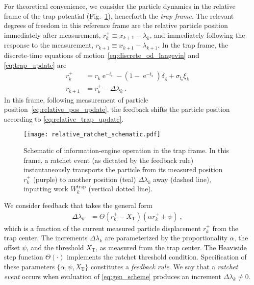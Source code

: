 \documentclass[%
reprint,
bibnotes, amsmath, amssymb, aps, pre,
 showkeys,
floatfix
]{revtex4-2}
\newcommand{\mrm}{\mathrm}
\newcommand{\pr}[1]{\left(#1\right)} %
\newcommand{\dg}{\delta_{\mrm{g}}}
\newcommand{\ts}{t_{\mrm{s}}}
\newcommand{\dlk}{\Delta\lambda_{k}}
\newcommand{\xkp}{x_{k+1}}
\newcommand{\lk}{\lambda_{k}}
\newcommand{\lkp}{\lambda_{k+1}}
\newcommand{\xkr}{r_{k}}
\newcommand{\xkrp}{r_{k+1}}
\newcommand{\xkpr}{r_{k}^{+}}
\newcommand{\wt}{W^{\mrm{trap}}}
\newcommand{\xT}{X_{\mrm{T}}}
\DeclareMathOperator{\e}{e}
\begin{document}
For theoretical convenience, we consider the particle dynamics in the relative frame of the trap potential (Fig.~\ref{fig:relative_ratchet_schematic}), henceforth the \emph{trap frame}.
The relevant degrees of freedom in this reference frame are the relative particle position immediately after measurement, $\xkpr \equiv \xkp-\lk$, and immediately following the response to the measurement, $\xkrp \equiv \xkp-\lkp$. 
In the trap frame, the discrete-time equations of motion~\eqref{eq:discrete_od_langevin} and \eqref{eq:trap_update} are 
\begin{subequations}\label{eq:relative_update}
    \begin{align}
        \xkpr &= \xkr\e^{-\ts} - \pr{1-\e^{-\ts}}\dg + \sigma_{\ts}\xi_{k}\label{eq:relative_pos_update}\\
        \xkrp &= \xkpr - \dlk \ . \label{eq:relative_trap_update}
    \end{align}
\end{subequations}
In this frame, following measurement of particle position~\eqref{eq:relative_pos_update}, the feedback shifts the particle position according to \eqref{eq:relative_trap_update}.

\begin{figure}[htbp]
    \centering
    \texttt{[image: relative\_ratchet\_schematic.pdf]}
    \caption{
        Schematic of information-engine operation in the trap frame.
        In this frame, a ratchet event (as dictated by the feedback rule) instantaneously transports the particle from its measured position $\xkpr$ (purple) to another position (teal) $\dlk$ away (dashed line), inputting work $\wt_{k}$ (vertical dotted line).
        }
    \label{fig:relative_ratchet_schematic}
\end{figure}

We consider feedback that takes the general form
\begin{align}
    \dlk &= \Theta\pr{\xkpr-\xT}\pr{\alpha\xkpr + \psi}\ , \label{eq:gen_scheme} 
\end{align}
which is a function of the current measured particle displacement $\xkpr$ from the trap center.
The increments $\dlk$ are parameterized by the proportionality $\alpha$, the offset $\psi$, and the threshold $\xT$, as measured from the trap center. 
The Heaviside step function $\Theta\pr{\cdot}$ implements the ratchet threshold condition.
Specification of these parameters $\{\alpha,\psi,\xT\}$ constitutes a \emph{feedback rule}.
We say that a \emph{ratchet event} occurs when evaluation of \eqref{eq:gen_scheme} produces an increment $\dlk\neq 0$.
\end{document}
